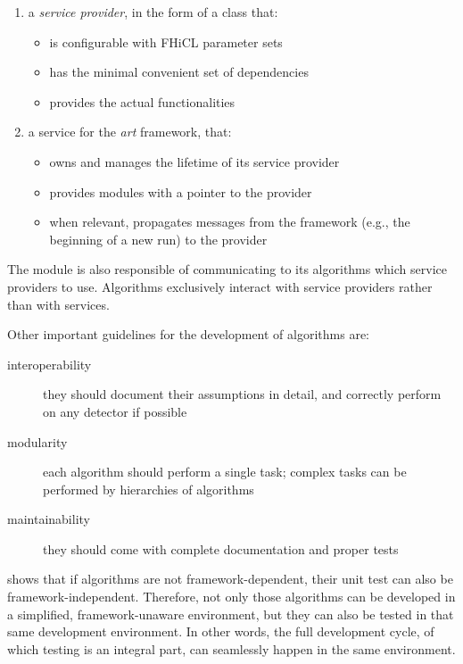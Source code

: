 \begin{enumerate}
   \item
      a \emph{service provider}, in the form of a class that:
      \begin{itemize}
         \item
            is configurable with FHiCL parameter sets
         \item
            has the minimal convenient set of dependencies
         \item
            provides the actual functionalities
      \end{itemize}
   \item
      a service for the \emph{art} framework, that:
      \begin{itemize}
         \item
            owns and manages the lifetime of its service provider
         \item
            provides modules with a pointer to the provider
         \item
            when relevant, propagates messages from the framework (e.g., the
            beginning of a new run) to the provider
      \end{itemize}
\end{enumerate}
The module is also responsible of communicating to its algorithms which
service providers to use. Algorithms exclusively interact with service
providers rather than with \ART services.

Other important guidelines for the development of algorithms are:

\begin{description}
   \item[interoperability]
      they should document their assumptions in detail,
     and correctly perform on any detector if possible
   \item[modularity]
      each algorithm should perform a single task;
      complex tasks can be performed by hierarchies of algorithms
   \item[maintainability]
      they should come with complete documentation and proper tests
\end{description}

 shows that if algorithms are not
framework-dependent, their unit test can also be framework-independent.
Therefore, not only those algorithms can be developed in a simplified,
framework-unaware environment, but they can also be tested in that same
development environment. In other words, the full development cycle, of
which testing is an integral part, can seamlessly happen in the same
environment.

